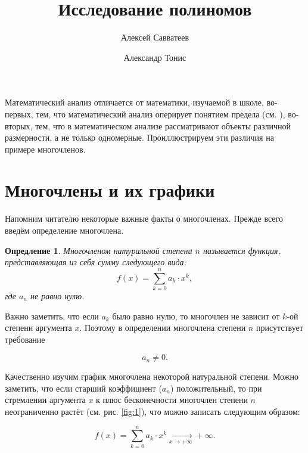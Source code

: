 \documentclass[12pt]{article}
\title{Исследование полиномов}
\author{Алексей Савватеев \and Александр Тонис}
\newtheorem{definition}{Опредление}[section]
\begin{document}
\maketitle
Математический анализ отличается от математики, изучаемой в школе, во\--первых, тем, что математический анализ оперирует понятием предела (см. \cite{lim_use}), во\--вторых, тем, что в математическом анализе рассматривают объекты различной размерности, а не только одномерные. Проиллюстрируем эти различия на примере многочленов.
\section{Многочлены и их графики}
Напомним читателю некоторые важные факты о многочленах. Прежде всего введём определение многочлена.

\begin{definition}
	Многочленом натуральной степени $n$ называется функция, представляющая из себя сумму следующего вида:
	\begin{equation}
	f(x) = \sum_{k=0}^n{a_k \cdot x^k},
	\end{equation}
	где $a_n$ не равно нулю.
\end{definition}

Важно заметить, что если $a_k$ было равно нулю, то многочлен не зависит от $k$\--ой степени аргумента $x$. Поэтому в определении многочлена степени $n$ присутствует требование

\begin{equation}
a_n \ne 0.
\end{equation}

\par
Качественно изучим график многочлена некоторой натуральной степени. Можно заметить, что если старший коэффициент ($a_n$) положительный, то при стремлении аргумента $x$ к плюс бесконечности многочлен степени $n$ неограниченно растёт (см. рис. \ref{fig:1}), что можно записать следующим образом:

\begin{equation}
f(x) = \sum_{k=0}^n{a_k \cdot x^k} \underset{x\rightarrow+\infty}{\longrightarrow}+\infty.
\end{equation}
\end{document}
